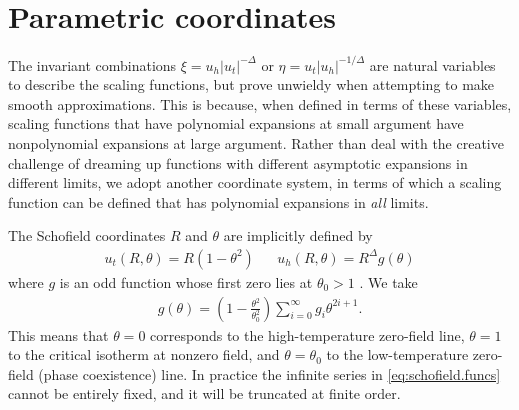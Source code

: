 \documentclass[
aps,
pre,
preprint,
longbibliography,
floatfix
]{revtex4-2}
\begin{document}
\section{Parametric coordinates}

The invariant combinations $\xi=u_h|u_t|^{-\Delta}$ or
$\eta=u_t|u_h|^{-1/\Delta}$ are natural variables to describe the scaling
functions, but prove unwieldy when attempting to make smooth approximations.
This is because, when defined in terms of these variables, scaling functions
that have polynomial expansions at small argument have nonpolynomial expansions
at large argument. Rather than deal with the creative challenge of dreaming up
functions with different asymptotic expansions in different limits, we adopt
another coordinate system, in terms of which a scaling function can be defined
that has polynomial expansions in \emph{all} limits.

The Schofield coordinates $R$ and $\theta$ are implicitly defined by
\begin{align} \label{eq:schofield}
  u_t(R, \theta) = R(1-\theta^2)
  &&
  u_h(R, \theta) = R^{\Delta}g(\theta)
\end{align}
where $g$ is an odd function whose first zero lies at $\theta_0>1$
\cite{Schofield_1969_Parametric}. We take
\begin{align} \label{eq:schofield.funcs}
  g(\theta)=\left(1-\frac{\theta^2}{\theta_0^2}\right)\sum_{i=0}^\infty g_i\theta^{2i+1}.
\end{align}
This means that $\theta=0$ corresponds to the high-temperature zero-field line,
$\theta=1$ to the critical isotherm at nonzero field, and $\theta=\theta_0$ to
the low-temperature zero-field (phase coexistence) line.
In practice the infinite series in \eqref{eq:schofield.funcs} cannot be
entirely fixed, and it will be truncated at finite order.
\end{document}
